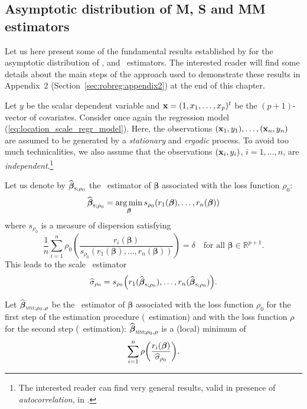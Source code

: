\subsection{Asymptotic distribution of M, S and MM estimators}
\label{subsec:asymptotic_distr_M_S_MM_estimators}

Let us here present some of the fundamental results established by
\citet{Croux:2003} for the asymptotic distribution of ,  and
~estimators. The interested reader will find some details about the
main steps of the approach used to demonstrate these results in Appendix~2
(Section~\ref{sec:robreg:appendix2}) at the end of this chapter.

Let $y$ be the scalar dependent variable and $\mathbf x = (1, x_1, \dots,
x_p)^t$ be the $(p+1)$-vector of covariates. Consider once again the regression
model (\ref{eq:location_scale_regr_model}). Here, the observations
$(\mathbf x_1, y_1), \dots, (\mathbf x_n, y_n)$ are assumed to be generated by
a \emph{stationary} and \emph{ergodic} process. To avoid too much
technicalities, we also assume that the observations $(\mathbf x_i, y_i)$, $i =
1, \dots, n$, are \emph{independent}.\footnote{The interested reader can find
very general results, valid in presence of \emph{autocorrelation}, in
\citet{Croux:2003}.}

Let us denote by $\sthat{\boldsymbol\beta}_{\stsc{S};\rho_0}$ the
~estimator of $\boldsymbol\beta$ associated with the loss function
$\rho_0$:
\[
    \sthat{\boldsymbol\beta}_{\stsc{S};\rho_0} = 
    \argmin_{\boldsymbol{\beta}} s_{\rho_0}(r_1(\boldsymbol\beta), \dots, 
    r_n(\boldsymbol\beta))
\]
where $s_{\rho_0}$ is a measure of dispersion satisfying
\[
    \frac{1}{n} \sum_{i=1}^{n} 
    \rho_0\left(\frac{r_i(\boldsymbol\beta)}{s_{\rho_0}(r_1(\boldsymbol\beta), 
        \dots, r_n(\boldsymbol\beta))}\right) 
    = \delta\quad\text{for all $\boldsymbol\beta \in \mathbb{R}^{p+1}$.}
\]
This leads to the scale ~estimator
\[
    \sthat{\sigma}_{\rho_0} = 
    s_{\rho_0} \left(r_1(\widehat{\boldsymbol\beta}_{\stsc{S};\rho_0}), \dots, 
    r_n(\sthat{\boldsymbol\beta}_{\stsc{S};\rho_0})\right).
\]

Let $\sthat{\boldsymbol\beta}_{\stsc{MM};\rho_0,\rho}$ be the 
~estimator of $\boldsymbol\beta$ associated with the loss function $\rho_0$ for
the first step of the estimation procedure (~estimation) and with the
loss function $\rho$ for the second step (~estimation):
$\sthat{\boldsymbol\beta}_{\stsc{MM};\rho_0,\rho}$ is a (local) minimum of
\[
    \sum_{i=1}^{n} \rho\left(\frac{r_i(\boldsymbol\beta)}{\sthat{\sigma}_{\rho_0}}\right).
\]

